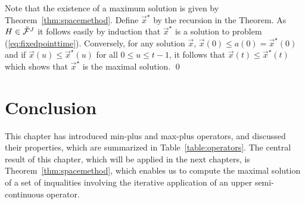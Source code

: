%
\pr
Note that the existence of a maximum solution is given by Theorem~\ref{thm:spacemethod}.
Define $\vec{x}^{\star}$ by the recursion in the Theorem. As $H \in \tilde{\mathcal F}^J$ it
follows easily by induction that
$\vec{x}^{\star}$ is a solution to problem (\ref{eq:fixedpointtime}).
Conversely, for any solution $\vec{x}$, $\vec{x}(0) \leq a(0) = \vec{x}^{\star}(0)$ and if
$\vec{x}(u) \leq \vec{x}^{\star}(u)$ for all $0 \leq u \leq t-1$, it follows that
$\vec{x}(t) \leq \vec{x}^{\star}(t)$ which shows that $\vec{x}^{\star}$ is the maximal solution.
\qed

\section{Conclusion}

This chapter has introduced min-plus and max-plus operators, and discussed their properties, which are summarized in Table~\ref{table:operators}. The central result of this chapter, which will be applied in the next chapters, is Theorem~\ref{thm:spacemethod}, which enables us to compute the maximal solution of a set of inqualities involving the iterative application of an upper semi-continuous operator.

